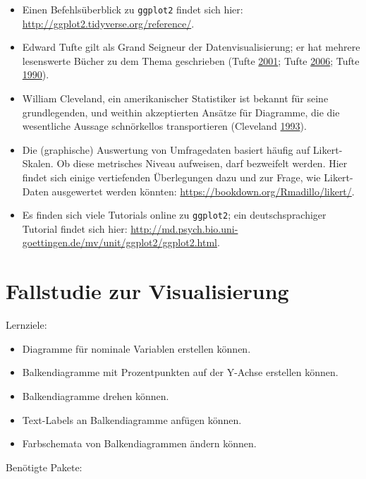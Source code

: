 \documentclass[12pt,ngerman,]{book}
\providecommand{\tightlist}{%
  \setlength{\itemsep}{0pt}\setlength{\parskip}{0pt}}
\let\BeginKnitrBlock\begin \let\EndKnitrBlock\end
\begin{document}
\begin{itemize}
\item
  Einen Befehlsüberblick zu \texttt{ggplot2} findet sich hier:
  \url{http://ggplot2.tidyverse.org/reference/}.
\item
  Edward Tufte gilt als Grand Seigneur der Datenvisualisierung; er hat
  mehrere lesenswerte Bücher zu dem Thema geschrieben (Tufte
  \protect\hyperlink{ref-1930824130}{2001}; Tufte
  \protect\hyperlink{ref-1930824165}{2006}; Tufte
  \protect\hyperlink{ref-1930824149}{1990}).
\item
  William Cleveland, ein amerikanischer Statistiker ist bekannt für
  seine grundlegenden, und weithin akzeptierten Ansätze für Diagramme,
  die die wesentliche Aussage schnörkellos transportieren (Cleveland
  \protect\hyperlink{ref-Cleveland}{1993}).
\item
  Die (graphische) Auswertung von Umfragedaten basiert häufig auf
  Likert-Skalen. Ob diese metrisches Niveau aufweisen, darf bezweifelt
  werden. Hier findet sich einige vertiefenden Überlegungen dazu und zur
  Frage, wie Likert-Daten ausgewertet werden könnten:
  \url{https://bookdown.org/Rmadillo/likert/}.
\item
  Es finden sich viele Tutorials online zu \texttt{ggplot2}; ein
  deutschsprachiger Tutorial findet sich hier:
  \url{http://md.psych.bio.uni-goettingen.de/mv/unit/ggplot2/ggplot2.html}.
\end{itemize}

\chapter{Fallstudie zur
Visualisierung}\label{fallstudie-zur-visualisierung}

\BeginKnitrBlock{rmdcaution}
Lernziele:

\begin{itemize}
\tightlist
\item
  Diagramme für nominale Variablen erstellen können.
\item
  Balkendiagramme mit Prozentpunkten auf der Y-Achse erstellen können.
\item
  Balkendiagramme drehen können.
\item
  Text-Labels an Balkendiagramme anfügen können.
\item
  Farbschemata von Balkendiagrammen ändern können.
\end{itemize}
\EndKnitrBlock{rmdcaution}

Benötigte Pakete:
\end{document}
